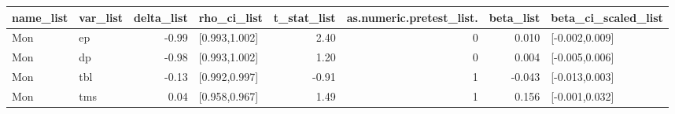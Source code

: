 \begin{table}[ht]
\centering
\begin{tabular}{llrlrrrl}
  \hline
name\_list & var\_list & delta\_list & rho\_ci\_list & t\_stat\_list & as.numeric.pretest\_list. & beta\_list & beta\_ci\_scaled\_list \\ 
  \hline
Mon & ep & -0.99 & [0.993,1.002] & 2.40 & 0 & 0.010 & [-0.002,0.009] \\ 
  Mon & dp & -0.98 & [0.993,1.002] & 1.20 & 0 & 0.004 & [-0.005,0.006] \\ 
  Mon & tbl & -0.13 & [0.992,0.997] & -0.91 & 1 & -0.043 & [-0.013,0.003] \\ 
  Mon & tms & 0.04 & [0.958,0.967] & 1.49 & 1 & 0.156 & [-0.001,0.032] \\ 
   \hline
\end{tabular}
\end{table}
